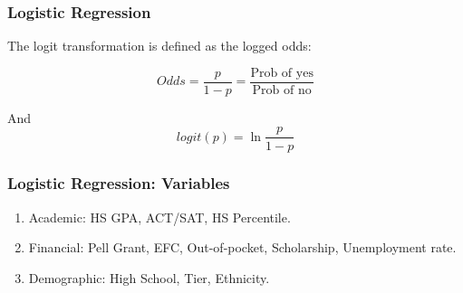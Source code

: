 \documentclass{beamer}
\begin{document}
\begin{frame}
    \frametitle{Logistic Regression}
  The logit transformation is defined as the logged odds:
  
\begin{equation}
	Odds = \frac{p}{1-p} = \frac{\text{Prob of yes}}
    {\text{Prob of no}}
\end{equation}

And 
\begin{equation}
logit(p) = \ln{\frac{p}{1-p}}
\end{equation}
\end{frame}



\begin{frame}
\frametitle{Logistic Regression: Variables}

\begin{enumerate}
\item Academic: HS GPA, ACT/SAT, HS Percentile.
\item Financial: Pell Grant, EFC, Out-of-pocket, Scholarship,
	Unemployment rate.
\item Demographic: High School, Tier, Ethnicity. 
\end{enumerate}

\end{frame}
\end{document}

